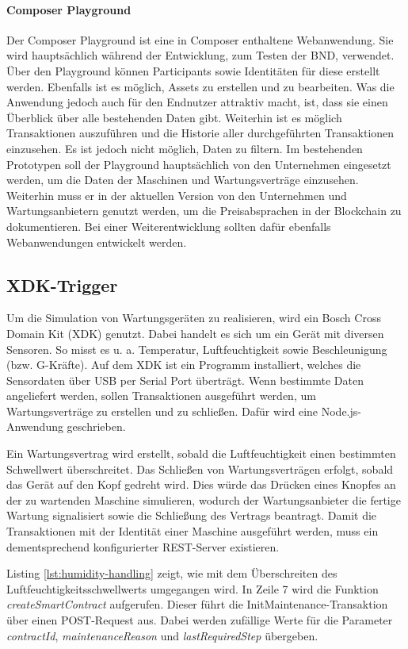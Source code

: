 \paragraph{Composer Playground}
Der Composer Playground ist eine in Composer enthaltene Webanwendung. Sie wird hauptsächlich während der Entwicklung, zum Testen der \acs{BND}, verwendet. Über den Playground können Participants sowie Identitäten für diese erstellt werden. Ebenfalls ist es möglich, Assets zu erstellen und zu bearbeiten. Was die Anwendung jedoch auch für den Endnutzer attraktiv macht, ist, dass sie einen Überblick über alle bestehenden Daten gibt. Weiterhin ist es möglich Transaktionen auszuführen und die Historie aller durchgeführten Transaktionen einzusehen. Es ist jedoch nicht möglich, Daten zu filtern. Im bestehenden Prototypen soll der Playground hauptsächlich von den Unternehmen eingesetzt werden, um die Daten der Maschinen und Wartungsverträge einzusehen. Weiterhin muss er in der aktuellen Version von den Unternehmen und Wartungsanbietern genutzt werden, um die Preisabsprachen in der Blockchain zu dokumentieren. Bei einer Weiterentwicklung sollten dafür ebenfalls Webanwendungen entwickelt werden.

\subsection{XDK-Trigger}
Um die Simulation von Wartungsgeräten zu realisieren, wird ein Bosch Cross Domain Kit (XDK) genutzt. Dabei handelt es sich um ein Gerät mit diversen Sensoren. So misst es u. a. Temperatur, Luftfeuchtigkeit sowie Beschleunigung (bzw. G-Kräfte). Auf dem XDK ist ein Programm installiert, welches die Sensordaten über USB per Serial Port überträgt. Wenn bestimmte Daten angeliefert werden, sollen Transaktionen ausgeführt werden, um Wartungsverträge zu erstellen und zu schließen. Dafür wird eine Node.js-Anwendung geschrieben.

Ein Wartungsvertrag wird erstellt, sobald die Luftfeuchtigkeit einen bestimmten Schwellwert überschreitet. Das Schließen von Wartungsverträgen erfolgt, sobald das Gerät auf den Kopf gedreht wird. Dies würde das Drücken eines Knopfes an der zu wartenden Maschine simulieren, wodurch der Wartungsanbieter die fertige Wartung signalisiert sowie die Schließung des Vertrags beantragt. Damit die Transaktionen mit der Identität einer Maschine ausgeführt werden, muss ein dementsprechend konfigurierter REST-Server existieren. 

Listing \ref{lst:humidity-handling} zeigt, wie mit dem Überschreiten des Luftfeuchtigkeitsschwellwerts umgegangen wird. In Zeile 7 wird die Funktion \textit{createSmartContract} aufgerufen. Dieser führt die InitMaintenance-Transaktion über einen POST-Request aus. Dabei werden zufällige Werte für die Parameter \textit{contractId}, \textit{maintenanceReason} und \textit{lastRequiredStep} übergeben.

